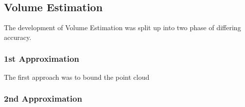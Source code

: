 \subsection{Volume Estimation}
\label{volume estimation}
The development of Volume Estimation was split up into two phase of differing accuracy.
\subsubsection{1st Approximation}
\label{volume estimation:1st}
The first approach was to bound the point cloud
\subsubsection{2nd Approximation}
\label{volume estimation:2nd}